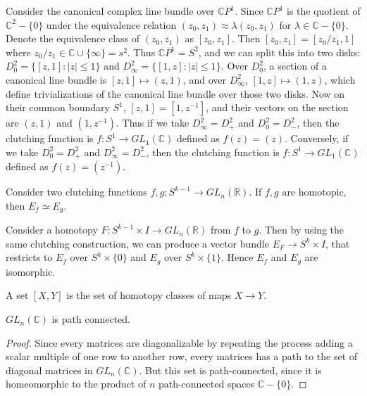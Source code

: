 \begin{exmp} Consider the canonical complex line bundle over $\mathbb{C}P^1$. Since $\mathbb{C}P^1$ is the quotient of $\mathbb{C}^2-\{0\}$ under the equivalence relation $(z_0,z_1)\approx \lambda(z_0,z_1)$ for $\lambda\in \mathbb{C}-\{0\}$. Denote the equivalence class of $(z_0,z_1)$ as $[z_0,z_1]$. Then $[z_0,z_1]=[z_0/z_1,1]$ where $z_0/z_1\in \mathbb{C}\cup \{\infty\}=s^2$. Thus $\mathbb{C}P^1=S^2$, and we can split this into two disks: $D_0^2=\{[z,1]:|z|\leq 1\}$ and $D_\infty^2=\{[1,z]:|z|\leq 1\}$. Over $D_0^2$, a section of a canonical line bundle is $[z,1]\mapsto (z,1)$, and over $D_\infty^2$, $[1,z]\mapsto (1,z)$, which define trivializations of the canonical line bundle over those two disks. Now on their common boundary $S^1$, $[z,1]=[1,z^{-1}]$, and their vectors on the section are $(z,1)$ and $(1,z^{-1})$. Thus if we take $D_\infty^2=D_+^2$ and $D_0^2=D_-^2$, then the clutching function is $f:S^1\rightarrow GL_1(\mathbb{C})$ defined as $f(z)=(z)$. Conversely, if we take $D_0^2=D_+^2$ and $D_\infty^2=D_-^2$, then the clutching function is $f:S^1\rightarrow GL_1(\mathbb{C})$ defined as $f(z)=(z^{-1})$. 
\end{exmp}

\begin{prop} Consider two clutching functions $f,g:S^{k-1}\rightarrow GL_n(\mathbb{R})$. If $f,g$ are homotopic, then $E_f\simeq E_g$.
\end{prop}
\begin{prop}
Consider a homotopy $F:S^{k-1}\times I\rightarrow GL_n(\mathbb{R})$ from $f$ to $g$. Then by using the same clutching construction, we can produce a vector bundle $E_F\rightarrow S^k\times I$, that restricts to $E_f$ over $S^k\times \{0\}$ and $E_g$ over $S^k\times \{1\}$. Hence $E_f$ and $E_g$ are isomorphic.
\end{prop}

\begin{defn} A set $[X,Y]$ is the set of homotopy classes of maps $X\rightarrow Y$.
\end{defn}

\begin{lemma} $GL_n(\mathbb{C})$ is path connected.
\end{lemma}
\begin{proof}
Since every matrices are diagonalizable by repeating the process adding a scalar multiple of one row to another row, every matrices has a path to the set of diagonal matrices in $GL_n(\mathbb{C})$. But this set is path-connected, since it is homeomorphic to the product of $n$ path-connected spaces $\mathbb{C}-\{0\}$.
\end{proof}

